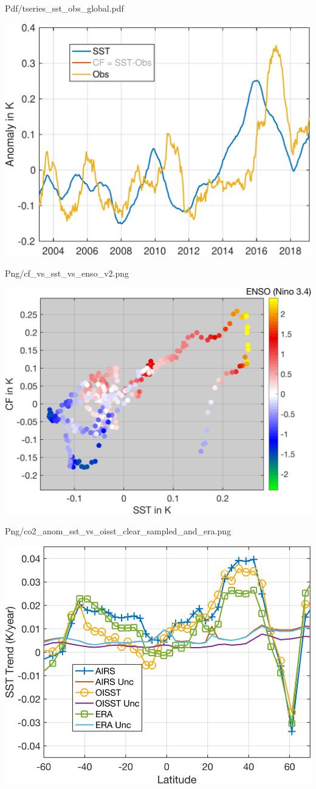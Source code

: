 \documentclass[presentation]{beamer}
\begin{document}
\begin{frame}[label={sec:org4b724a0}]{Pdf/tseries\_sst\_obs\_global.pdf}
\begin{center}
\includegraphics[width=0.7\linewidth]{./Figs/Pdf/tseries_sst_obs_global.pdf}
\end{center}
\end{frame}

\begin{frame}[label={sec:org51ba280}]{Png/cf\_vs\_sst\_vs\_enso\_v2.png}
\begin{center}
\includegraphics[width=0.7\linewidth]{./Figs/Png/cf_vs_sst_vs_enso_v2.png}
\end{center}
\end{frame}

\begin{frame}[label={sec:orga061967}]{Png/co2\_anom\_sst\_vs\_oisst\_clear\_sampled\_and\_era.png}
\begin{center}
\includegraphics[width=0.7\linewidth]{./Figs/Png/co2_anom_sst_vs_oisst_clear_sampled_and_era.png}
\end{center}
\end{frame}
\end{document}
